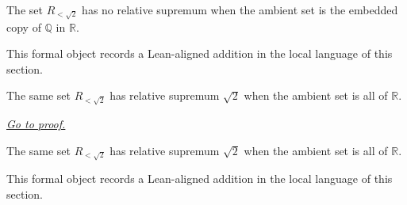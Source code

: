 \begin{remark*}
The set $R_{<\sqrt2}$ has no relative supremum when the ambient set is the embedded copy of $\mathbb Q$ in $\mathbb R$.
\end{remark*}

\begin{remark*}[Interpretation]
This formal object records a Lean-aligned addition in the local language of this section.
\end{remark*}

\begin{dependencies}
\NoLocalDependencies
\end{dependencies}
\begin{theorem}
\label{thm:relative-supremum-of-rationals-in-r-example}
The same set $R_{<\sqrt2}$ has relative supremum $\sqrt2$ when the ambient set is all of $\mathbb R$.

\smallskip
\noindent
\hyperref[prf:relative-supremum-of-rationals-in-r-example]{\textit{Go to proof.}}
\end{theorem}

\begin{remark*}
The same set $R_{<\sqrt2}$ has relative supremum $\sqrt2$ when the ambient set is all of $\mathbb R$.
\end{remark*}

\begin{remark*}[Interpretation]
This formal object records a Lean-aligned addition in the local language of this section.
\end{remark*}

\begin{dependencies}
\NoLocalDependencies
\end{dependencies}
